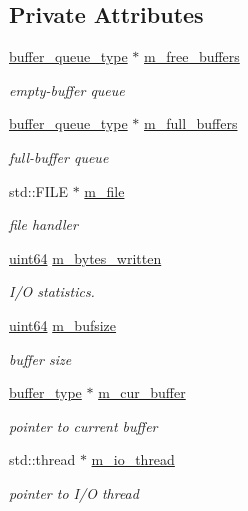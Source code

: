 \subsection*{Private Attributes}
\begin{DoxyCompactItemize}
\item 
\hyperlink{classasync__stream__writer_a44dba276c5208314653dd887010e7161}{buffer\+\_\+queue\+\_\+type} $\ast$ \hyperlink{classasync__stream__writer_ad451ef8f2eb1c884b38cd10f387ac325}{m\+\_\+free\+\_\+buffers}
\begin{DoxyCompactList}\small\item\em empty-\/buffer queue \end{DoxyCompactList}\item 
\hyperlink{classasync__stream__writer_a44dba276c5208314653dd887010e7161}{buffer\+\_\+queue\+\_\+type} $\ast$ \hyperlink{classasync__stream__writer_a091edd8f3eab9d64c3bc3396d4fb7994}{m\+\_\+full\+\_\+buffers}
\begin{DoxyCompactList}\small\item\em full-\/buffer queue \end{DoxyCompactList}\item 
std\+::\+F\+I\+LE $\ast$ \hyperlink{classasync__stream__writer_ac8b191bccfc233007594d07c1bb228d4}{m\+\_\+file}
\begin{DoxyCompactList}\small\item\em file handler \end{DoxyCompactList}\item 
\hyperlink{types_8h_a60e8696a4678cd348e991a1f172e53f7}{uint64} \hyperlink{classasync__stream__writer_a2e6bf4e33430ee652475dea9ce1ec7c5}{m\+\_\+bytes\+\_\+written}
\begin{DoxyCompactList}\small\item\em I/O statistics. \end{DoxyCompactList}\item 
\hyperlink{types_8h_a60e8696a4678cd348e991a1f172e53f7}{uint64} \hyperlink{classasync__stream__writer_aea362e479496cec38f62cfe60402a390}{m\+\_\+bufsize}
\begin{DoxyCompactList}\small\item\em buffer size \end{DoxyCompactList}\item 
\hyperlink{classasync__stream__writer_a7e813664993581eab8d5fc6bcff2ce19}{buffer\+\_\+type} $\ast$ \hyperlink{classasync__stream__writer_aad27ed30f3cc0ac67c171894ff286871}{m\+\_\+cur\+\_\+buffer}
\begin{DoxyCompactList}\small\item\em pointer to current buffer \end{DoxyCompactList}\item 
std\+::thread $\ast$ \hyperlink{classasync__stream__writer_a4298b5c3a6950422907f0e59580386dd}{m\+\_\+io\+\_\+thread}
\begin{DoxyCompactList}\small\item\em pointer to I/O thread \end{DoxyCompactList}\end{DoxyCompactItemize}


